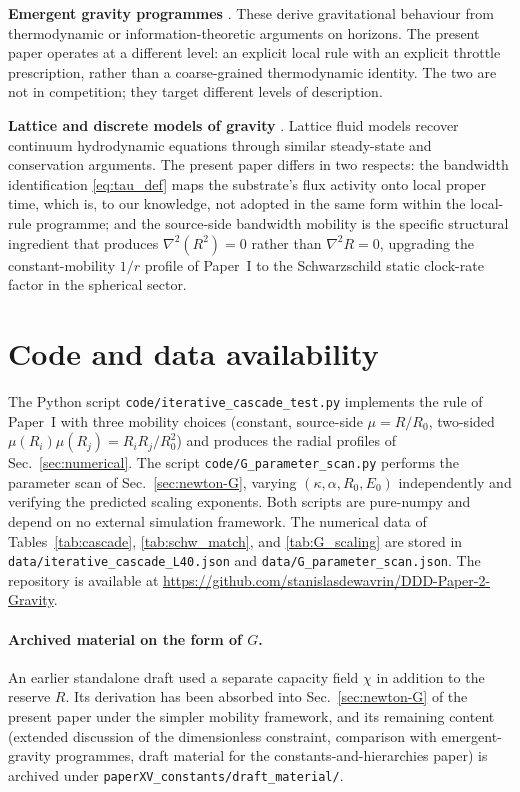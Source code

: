 \documentclass[11pt,a4paper]{article}
\begin{document}
\textbf{Emergent gravity programmes}
\cite{verlinde2011,padmanabhan2010,jacobson1995}. These
derive gravitational behaviour from thermodynamic or
information-theoretic arguments on horizons. The present
paper operates at a different level: an explicit local rule
with an explicit throttle prescription, rather than a
coarse-grained thermodynamic identity. The two are not in
competition; they target different levels of description.

\textbf{Lattice and discrete models of gravity}
\cite{benzi1992,wolfram2002,thooft2016,regge1961,ambjorn2012cdt}. Lattice fluid models
recover continuum hydrodynamic equations through similar
steady-state and conservation arguments. The present paper
differs in two respects: the bandwidth identification
\eqref{eq:tau_def} maps the substrate's flux activity onto
local proper time, which is, to our knowledge, not adopted in
the same form within the local-rule programme; and the
source-side bandwidth mobility is the specific structural
ingredient that produces $\nabla^2(R^2) = 0$ rather than
$\nabla^2 R = 0$, upgrading the constant-mobility $1/r$ profile
of Paper~I to the Schwarzschild static clock-rate factor in the
spherical sector.

\section{Code and data availability}
\label{sec:code}

The Python script \texttt{code/iterative\_cascade\_test.py}
implements the rule of Paper~I with three mobility choices
(constant, source-side $\mu = R/R_0$, two-sided
$\mu(R_i)\mu(R_j) = R_i R_j / R_0^2$) and produces the radial
profiles of Sec.~\ref{sec:numerical}. The script
\texttt{code/G\_parameter\_scan.py} performs the parameter
scan of Sec.~\ref{sec:newton-G}, varying $(\kappa, \alpha,
R_0, E_0)$ independently and verifying the predicted scaling
exponents. Both scripts are pure-numpy and depend on no
external simulation framework. The numerical data of
Tables~\ref{tab:cascade}, \ref{tab:schw_match}, and
\ref{tab:G_scaling} are stored in
\texttt{data/iterative\_cascade\_L40.json} and
\texttt{data/G\_parameter\_scan.json}. The repository is
available at
\url{https://github.com/stanislasdewavrin/DDD-Paper-2-Gravity}.

\paragraph{Archived material on the form of $G$.}
An earlier standalone draft used a separate capacity field
$\chi$ in addition to the reserve $R$. Its derivation has been
absorbed into Sec.~\ref{sec:newton-G} of the present paper
under the simpler mobility framework, and its remaining
content (extended discussion of the dimensionless constraint,
comparison with emergent-gravity programmes, draft material
for the constants-and-hierarchies paper) is archived under
\texttt{paperXV\_constants/draft\_material/}.
\end{document}

